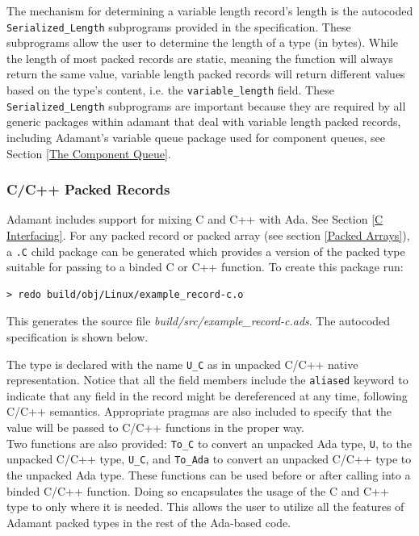 The mechanism for determining a variable length record's length is the autocoded \texttt{Serialized\_Length} subprograms provided in the specification. These subprograms allow the user to determine the length of a type (in bytes). While the length of most packed records are static, meaning the function will always return the same value, variable length packed records will return different values based on the type's content, i.e. the \texttt{variable\_length} field. These \texttt{Serialized\_Length} subprograms are important because they are required by all generic packages within adamant that deal with variable length packed records, including Adamant's variable queue package used for component queues, see Section \ref{The Component Queue}.

\subsubsection{C/C++ Packed Records} \label{C Packed Records}

Adamant includes support for mixing C and C++ with Ada. See Section \ref{C Interfacing}. For any packed record or packed array (see section \ref{Packed Arrays}), a \texttt{.C} child package can be generated which provides a version of the packed type suitable for passing to a binded C or C++ function. To create this package run:

\vspace{5mm} %
\begin{verbatim}
> redo build/obj/Linux/example_record-c.o
\end{verbatim}
\vspace{5mm} %

This generates the source file \textit{build/src/example\_record-c.ads}. The autocoded specification is shown below.


The type is declared with the name \texttt{U\_C} as in unpacked C/C++ native representation. Notice that all the field members include the \texttt{aliased} keyword to indicate that any field in the record might be dereferenced at any time, following C/C++ semantics. Appropriate pragmas are also included to specify that the value will be passed to C/C++ functions in the proper way. \\

Two functions are also provided: \texttt{To\_C} to convert an unpacked Ada type, \texttt{U}, to the unpacked C/C++ type, \texttt{U\_C}, and \texttt{To\_Ada} to convert an unpacked C/C++ type to the unpacked Ada type. These functions can be used before or after calling into a binded C/C++ function. Doing so encapsulates the usage of the C and C++ type to only where it is needed. This allows the user to utilize all the features of Adamant packed types in the rest of the Ada-based code. \\


